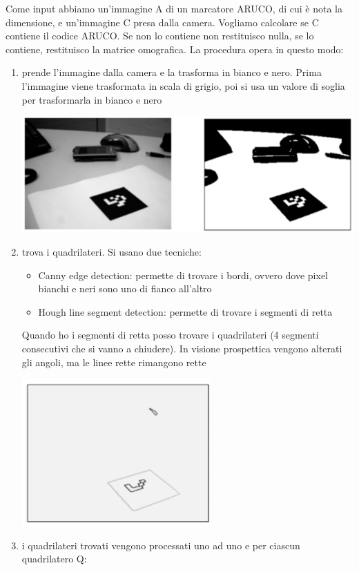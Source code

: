 \vspace{10px}
Come input abbiamo un'immagine A di un marcatore ARUCO, di cui è nota la dimensione, e un'immagine C presa dalla camera. Vogliamo calcolare se C contiene il codice ARUCO. Se non lo contiene non restituisco nulla, se lo contiene, restituisco la matrice omografica.
La procedura opera in questo modo:
\begin{enumerate}
    \item prende l'immagine dalla camera e la trasforma in bianco e nero. Prima l'immagine viene trasformata in scala di grigio, poi si usa un valore di soglia per trasformarla in bianco e nero
    \begin{center}
        \includegraphics[width=.6\textwidth]{images/MobiDEV/3. augmented reality/1. aruco.PNG}
    \end{center}
    \item trova i quadrilateri. Si usano due tecniche: 
    \begin{itemize}
        \item Canny edge detection: permette di trovare i bordi, ovvero dove pixel bianchi e neri sono uno di fianco all'altro
        \item Hough line segment detection: permette di trovare i segmenti di retta
    \end{itemize}
    Quando ho i segmenti di retta posso trovare i quadrilateri (4 segmenti consecutivi che si vanno a chiudere).
    In visione prospettica vengono alterati gli angoli, ma le linee rette rimangono rette
    \begin{center}
        \includegraphics[width=.3\textwidth]{images/MobiDEV/3. augmented reality/2. aruco.PNG}
    \end{center}
    \item i quadrilateri trovati vengono processati uno ad uno e per ciascun quadrilatero Q:
    \begin{enumerate}[label*=\arabic*.]

\end{enumerate}
\end{enumerate}
